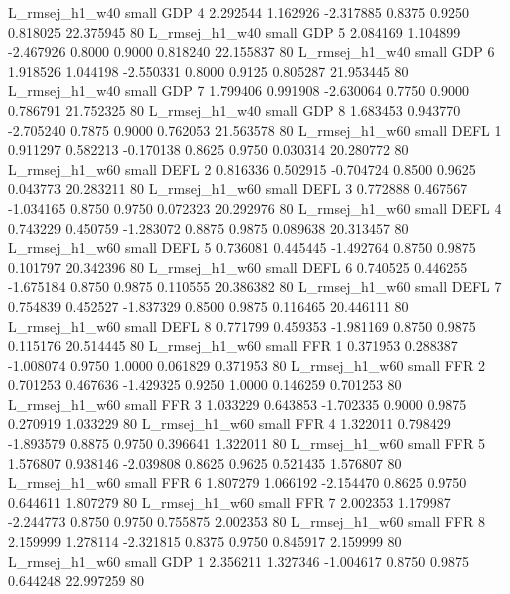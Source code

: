 L_rmsej_h1_w40      small      GDP                 4 2.292544 1.162926 -2.317885 0.8375 0.9250  0.818025   22.375945 80
L_rmsej_h1_w40      small      GDP                 5 2.084169 1.104899 -2.467926 0.8000 0.9000  0.818240   22.155837 80
L_rmsej_h1_w40      small      GDP                 6 1.918526 1.044198 -2.550331 0.8000 0.9125  0.805287   21.953445 80
L_rmsej_h1_w40      small      GDP                 7 1.799406 0.991908 -2.630064 0.7750 0.9000  0.786791   21.752325 80
L_rmsej_h1_w40      small      GDP                 8 1.683453 0.943770 -2.705240 0.7875 0.9000  0.762053   21.563578 80
L_rmsej_h1_w60      small     DEFL                 1 0.911297 0.582213 -0.170138 0.8625 0.9750  0.030314   20.280772 80
L_rmsej_h1_w60      small     DEFL                 2 0.816336 0.502915 -0.704724 0.8500 0.9625  0.043773   20.283211 80
L_rmsej_h1_w60      small     DEFL                 3 0.772888 0.467567 -1.034165 0.8750 0.9750  0.072323   20.292976 80
L_rmsej_h1_w60      small     DEFL                 4 0.743229 0.450759 -1.283072 0.8875 0.9875  0.089638   20.313457 80
L_rmsej_h1_w60      small     DEFL                 5 0.736081 0.445445 -1.492764 0.8750 0.9875  0.101797   20.342396 80
L_rmsej_h1_w60      small     DEFL                 6 0.740525 0.446255 -1.675184 0.8750 0.9875  0.110555   20.386382 80
L_rmsej_h1_w60      small     DEFL                 7 0.754839 0.452527 -1.837329 0.8500 0.9875  0.116465   20.446111 80
L_rmsej_h1_w60      small     DEFL                 8 0.771799 0.459353 -1.981169 0.8750 0.9875  0.115176   20.514445 80
L_rmsej_h1_w60      small      FFR                 1 0.371953 0.288387 -1.008074 0.9750 1.0000  0.061829    0.371953 80
L_rmsej_h1_w60      small      FFR                 2 0.701253 0.467636 -1.429325 0.9250 1.0000  0.146259    0.701253 80
L_rmsej_h1_w60      small      FFR                 3 1.033229 0.643853 -1.702335 0.9000 0.9875  0.270919    1.033229 80
L_rmsej_h1_w60      small      FFR                 4 1.322011 0.798429 -1.893579 0.8875 0.9750  0.396641    1.322011 80
L_rmsej_h1_w60      small      FFR                 5 1.576807 0.938146 -2.039808 0.8625 0.9625  0.521435    1.576807 80
L_rmsej_h1_w60      small      FFR                 6 1.807279 1.066192 -2.154470 0.8625 0.9750  0.644611    1.807279 80
L_rmsej_h1_w60      small      FFR                 7 2.002353 1.179987 -2.244773 0.8750 0.9750  0.755875    2.002353 80
L_rmsej_h1_w60      small      FFR                 8 2.159999 1.278114 -2.321815 0.8375 0.9750  0.845917    2.159999 80
L_rmsej_h1_w60      small      GDP                 1 2.356211 1.327346 -1.004617 0.8750 0.9875  0.644248   22.997259 80
